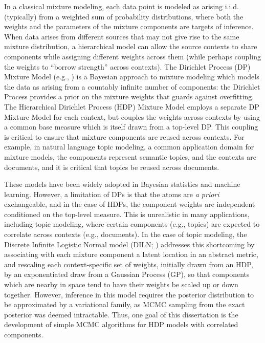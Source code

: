



In a classical mixture modeling, each data point is modeled as arising
i.i.d. (typically) from a weighted sum of probability distributions,
where both the weights and the parameters of the mixture components
are targets of inference.  When data arises from different sources
that may not give rise to the same mixture distribution, a
hierarchical model can allow the source contexts to share components while
assigning different weights across them (while perhaps coupling the
weights to ``borrow strength'' across contexts).  The Dirichlet
Process (DP) Mixture Model (e.g., \citet{rasmussen2000infinite}) is a Bayesian
approach to mixture modeling which models the data as arising from a countably
infinite number of components: the Dirichlet Process provides a prior
on the mixture weights that guards against overfitting.  The Hierarchical 
Dirichlet Process (HDP) Mixture Model \citep{teh2006hierarchical} employs
a separate DP Mixture Model for each context, but
couples the weights across contexts by using a common base measure which is
itself drawn from a top-level DP.  This coupling is critical to ensure
that mixture components are reused across contexts.
For example, in natural language topic modeling, a common application
domain for mixture models, the components represent semantic topics,
and the contexts are documents, and it is critical that topics be reused
across documents.

These models have been widely adopted in Bayesian statistics and
machine learning.  However, a limitation of DPs is that the atoms
are {\it a priori} exchangeable, and in the case of HDPs, the
component weights are independent conditioned on the top-level
measure.  This is unrealistic in many applications, including topic modeling, where certain
components (e.g., topics) are expected to correlate across contexts
(e.g., documents).  In the case of topic modeling, the Discrete
Infinite Logistic Normal model (DILN; \citet{paisley2011discrete}) addresses
this shortcoming by associating with each mixture component a latent
location in an abstract metric, and rescaling each context-specific
set of weights, initially drawn from an HDP, 
by an exponentiated draw from a Gaussian Process (GP), so that
components which are nearby in space tend to have their weights be
scaled up or down together.  However, inference in this model requires
the posterior distribution to be approximated by a variational family,
as MCMC sampling from the exact posterior was deemed intractable.
Thus, one goal of this dissertation is the development of simple MCMC
algorithms for HDP models with correlated components.

